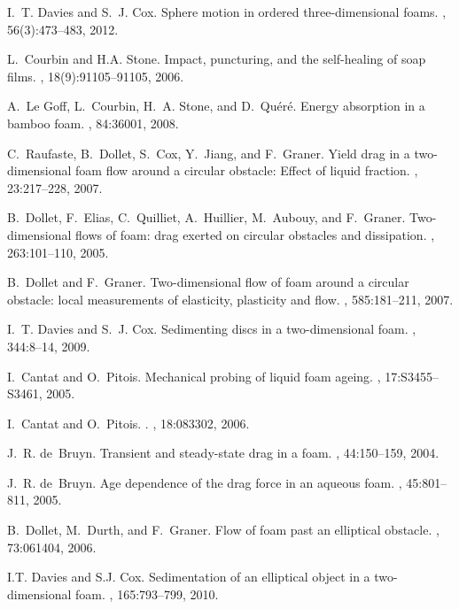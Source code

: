 \documentclass[preprint]{revtex4-1}
\begin{document}
\begin{thebibliography}{10}
I.~T. Davies and S.~J. Cox.
\newblock Sphere motion in ordered three-dimensional foams.
, 56(3):473--483, 2012.

L.~Courbin and H.A. Stone.
\newblock Impact, puncturing, and the self-healing of soap films.
, 18(9):91105--91105, 2006.

A.~Le Goff, L.~Courbin, H.~A. Stone, and D.~Qu\'{e}r\'{e}.
\newblock Energy absorption in a bamboo foam.
, 84:36001, 2008.

C.~Raufaste, B.~Dollet, S.~Cox, Y.~Jiang, and F.~Graner.
\newblock Yield drag in a two-dimensional foam flow around a circular obstacle:
  Effect of liquid fraction.
, 23:217--228, 2007.

B.~Dollet, F.~Elias, C.~Quilliet, A.~Huillier, M.~Aubouy, and F.~Graner.
\newblock Two-dimensional flows of foam: drag exerted on circular obstacles and
  dissipation.
, 263:101--110, 2005.

B.~Dollet and F.~Graner.
\newblock Two-dimensional flow of foam around a circular obstacle: local
  measurements of elasticity, plasticity and flow.
, 585:181--211, 2007.

I.~T. Davies and S.~J. Cox.
\newblock Sedimenting discs in a two-dimensional foam.
, 344:8--14, 2009.

I.~Cantat and O.~Pitois.
\newblock Mechanical probing of liquid foam ageing.
, 17:S3455--S3461, 2005.

I.~Cantat and O.~Pitois.
.
, 18:083302, 2006.

J.~R. de~Bruyn.
\newblock Transient and steady-state drag in a foam.
, 44:150--159, 2004.

J.~R. de~Bruyn.
\newblock Age dependence of the drag force in an aqueous foam.
, 45:801--811, 2005.

B.~Dollet, M.~Durth, and F.~Graner.
\newblock Flow of foam past an elliptical obstacle.
, 73:061404, 2006.

I.T. Davies and S.J. Cox.
\newblock Sedimentation of an elliptical object in a two-dimensional foam.
, 165:793--799, 2010.


\end{thebibliography}
\end{document}
